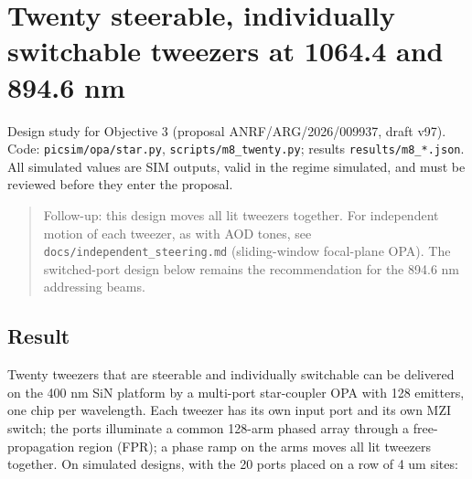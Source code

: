 \hypertarget{twenty-steerable-individually-switchable-tweezers-at-10644-and-8946-nm}{%
\chapter{Twenty steerable, individually switchable tweezers at 1064.4
and 894.6
nm}\label{twenty_tweezers-twenty-steerable-individually-switchable-tweezers-at-10644-and-8946-nm}}

Design study for Objective 3 (proposal ANRF/ARG/2026/009937, draft v97).
Code: \texttt{picsim/opa/star.py}, \texttt{scripts/m8\_twenty.py};
results \texttt{results/m8\_*.json}. All simulated values are SIM
outputs, valid in the regime simulated, and must be reviewed before they
enter the proposal.

\begin{quote}
Follow-up: this design moves all lit tweezers together. For independent
motion of each tweezer, as with AOD tones, see
\texttt{docs/independent\_steering.md} (sliding-window focal-plane OPA).
The switched-port design below remains the recommendation for the 894.6
nm addressing beams.
\end{quote}

\hypertarget{1-result}{%
\section{Result}\label{twenty_tweezers-1-result}}

Twenty tweezers that are steerable and individually switchable can be
delivered on the 400 nm SiN platform by a multi-port star-coupler OPA
with 128 emitters, one chip per wavelength. Each tweezer has its own
input port and its own MZI switch; the ports illuminate a common 128-arm
phased array through a free-propagation region (FPR); a phase ramp on
the arms moves all lit tweezers together. On simulated designs, with the
20 ports placed on a row of 4 um sites:

